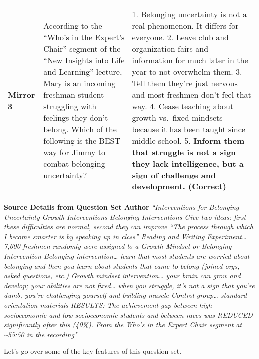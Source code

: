 \documentclass[
]{article}
\begin{document}
\begin{longtable}[]{@{}lll@{}}
\begin{minipage}[t]{0.67\columnwidth}
\end{minipage}\tabularnewline
\begin{minipage}[t]{0.03\columnwidth}\raggedright
\textbf{Mirror 3}\strut
\end{minipage} & \begin{minipage}[t]{0.21\columnwidth}\raggedright
According to the ``Who's in the Expert's Chair'' segment of the ``New Insights into Life and Learning'' lecture, Mary is an incoming freshman student struggling with feelings they don't belong. Which of the following is the BEST way for Jimmy to combat belonging uncertainty?\strut
\end{minipage} & \begin{minipage}[t]{0.67\columnwidth}\raggedright
1. Belonging uncertainty is not a real phenomenon. It differs for everyone. 2. Leave club and organization fairs and information for much later in the year to not overwhelm them. 3. Tell them they're just nervous and most freshmen don't feel that way. 4. Cease teaching about growth vs.~fixed mindsets because it has been taught since middle school. 5. \textbf{Inform them that struggle is not a sign they lack intelligence, but a sign of challenge and development. (Correct)}\strut
\end{minipage}\tabularnewline
\bottomrule
\end{longtable}

\textbf{Source Details from Question Set Author} \emph{``Interventions for Belonging Uncertainty Growth Interventions Belonging Interventions Give two ideas: first these difficulties are normal, second they can improve ``The process through which I become smarter is by speaking up in class'' Reading and Writing Experiment\ldots{} 7,600 freshmen randomly were assigned to a Growth Mindset or Belonging Intervention Belonging intervention\ldots{} learn that most students are worried about belonging and then you learn about students that came to belong (joined orgs, asked questions, etc.) Growth mindset intervention\ldots{} your brain can grow and develop; your abilities are not fixed\ldots{} when you struggle, it's not a sign that you're dumb, you're challenging yourself and building muscle Control group\ldots{} standard orientation materials RESULTS: The achievement gap between high-socioeconomic and low-socioeconomic students and between races was REDUCED significantly after this (40\%). From the Who's in the Expert Chair segment at \textasciitilde55:50 in the recording"}

Let's go over some of the key features of this question set.
\end{document}
